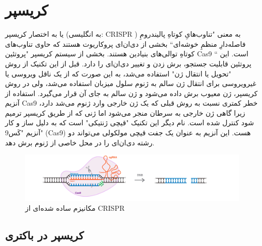 \documentclass[12pt,a4paper,BCOR=.7cm,headsepline,bibliography=totoc]{report}
\begin{document}
\section{کریسپر}
 یا به اختصار کریسپر (به انگلیسی: CRISPR ) به معنی "تناوب‌هایِ کوتاهِ پالیندرومِ فاصله‌دارِ منظمِ خوشه‌ای`` بخشی از دی‌ان‌ای پروکاریوت هستند که حاوی تناوب‌های کوتاهِ توالی‌های بنیادین هستند. بخشی از سیستم کریسپر "پروتئین Cas9 `` است. این پروتئین قابلیت جستجو، برش زدن و تغییر دی‌ان‌ای را دارد. قبل از این تکنیک از روش "تحویل یا انتقال ژن" استفاده می‌شد، به این صورت که از یک ناقل ویروسی یا غیرویروسی برای انتقال ژن سالم به ژنوم سلول میزبان استفاده می‌شد، ولی در روش کریسپر، ژن معیوب برش داده می‌شود و ژن سالم به جای آن قرار می‌گیرد. استفاده از آنزیم Cas9 خطر کمتری نسبت به روش قبلی که یک ژن خارجی وارد ژنوم می‌شد دارد، زیرا گاهی ژن خارجی به سرطان منجر می‌شود اما ژنی که از طریق کریسپر ترمیم شود کنترل شده است. نام دیگر این تکنیک "قیچی ژنتیکی" است که به دلیل ساز و کار آنزیم "کَس9" (Cas9) هست. این آنزیم به عنوان یک جفت قیچی مولکولی می‌تواند دو رشته دی‌ان‌ای را در محل خاصی از ژنوم برش دهد.\cite{TED}
\begin{figure}[!h]
\centering
\includegraphics[width=15cm, ]{pictures/simple_crispr.jpg}
\caption{
مکانیزم ساده شده‌ای از CRISPR \cite{graph4}
}\label{fig:1}
\end{figure}

\subsection{کریسپر در باکتری}
\end{document}
